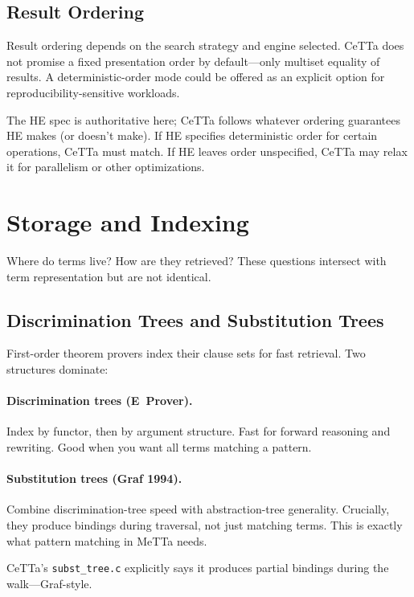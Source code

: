 \documentclass[11pt]{article}
\newcommand{\code}[1]{\texttt{#1}}
\newcommand{\HE}{\textup{HE}}
\newcommand{\CeTTa}{\textup{CeTTa}}
\begin{document}
\subsection{Result Ordering}

Result ordering depends on the search strategy and engine selected.
\CeTTa{} does not promise a fixed presentation order by default---only
multiset equality of results.  A deterministic-order mode could be offered
as an explicit option for reproducibility-sensitive workloads.

The \HE{} spec is authoritative here; \CeTTa{} follows whatever ordering
guarantees \HE{} makes (or doesn't make).  If \HE{} specifies deterministic
order for certain operations, \CeTTa{} must match.  If \HE{} leaves order
unspecified, \CeTTa{} may relax it for parallelism or other optimizations.

\section{Storage and Indexing}
\label{sec:storage}

Where do terms live?  How are they retrieved?  These questions intersect
with term representation but are not identical.

\subsection{Discrimination Trees and Substitution Trees}

First-order theorem provers index their clause sets for fast retrieval.
Two structures dominate:

\paragraph{Discrimination trees (E~Prover).}
Index by functor, then by argument structure.  Fast for forward reasoning
and rewriting.  Good when you want all terms matching a pattern.

\paragraph{Substitution trees (Graf 1994).}
Combine discrimination-tree speed with abstraction-tree generality.
Crucially, they produce bindings during traversal, not just matching terms.
This is exactly what pattern matching in MeTTa needs.

\CeTTa{}'s \code{subst\_tree.c} explicitly says it produces partial
bindings during the walk---Graf-style.
\end{document}
